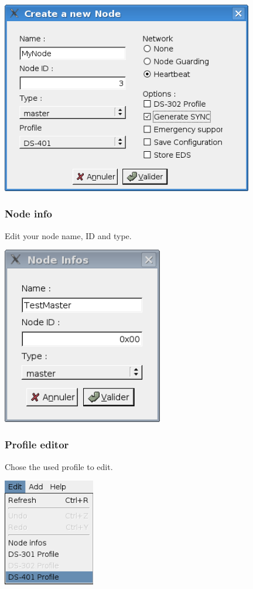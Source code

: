 \documentclass[a4paper,12pt]{book}
\begin{document}
 \begin{center}
   \includegraphics[width=11cm]{Pictures/10000201000001CB0000015F4FC09B68.png}
\end{center}

\subsubsection{Node info}
Edit your node name, ID and type.

 \begin{center}
   \includegraphics[width=7cm]{Pictures/10000201000001010000011DA724D25C.png}
\end{center}

\subsubsection{Profile editor}
Chose the used profile to edit.\newline
 \begin{center}
   \includegraphics[width=4cm]{Pictures/10000000000000AB000000C88F594413.png}
\end{center}
\end{document}
